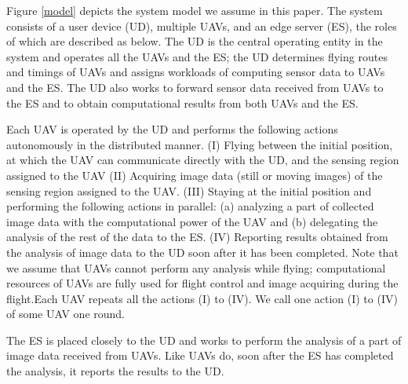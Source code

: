 \documentclass{ieeeaccess}
\begin{document}
Figure \ref{model} depicts the system model we assume in this paper. 
The system consists of a user device (UD), multiple UAVs, and an edge server (ES), the roles of which are described as below.
%
The UD is the central operating entity in the system and operates all the UAVs and the ES; the UD determines flying routes and timings of UAVs and assigns workloads of computing sensor data to UAVs and the ES.
%
The UD also works to forward sensor data received from UAVs to the ES and to obtain computational results from both UAVs and the ES.

Each UAV is operated by the UD and performs the following actions autonomously in the distributed manner.
%
(I) Flying between the initial position, at which the UAV can communicate directly with the UD, and the sensing region assigned to the UAV 
(I\hspace{-.1em}I) Acquiring image data (still or moving images) of the sensing region assigned to the UAV.
(I\hspace{-.1em}I\hspace{-.1em}I) Staying at the initial position and performing the following actions in parallel: (a) analyzing a part of collected image data with the computational power of the UAV and (b) delegating the analysis of the rest of the data to the ES.
(I\hspace{-.1em}V) Reporting results obtained from the analysis of image data to the UD soon after it has been completed.
%
Note that we assume that UAVs cannot perform any analysis while flying; computational resources of UAVs are fully used for flight control and image acquiring during the flight.Each UAV repeats all the actions (I) to (I\hspace{-.1em}V). We call one action (I) to (I\hspace{-.1em}V) of some UAV one round.

The ES is placed closely to the UD and works to perform the analysis of a part of image data received from UAVs.
%
Like UAVs do, soon after the ES has completed the analysis, it reports the results to the UD.
%
\end{document}

